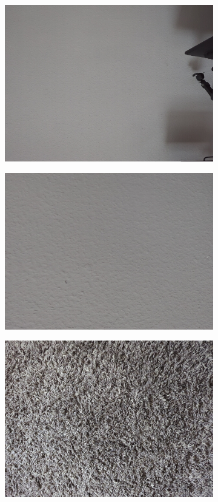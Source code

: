 \begin{figure}[h!t]
    \centering
    \begin{subfigure}[b]{0.25\textwidth}
        \centering
        \includegraphics[width=0.9\linewidth]{images/materials/wall-far-cam}
    \end{subfigure}%
    \begin{subfigure}[b]{0.25\textwidth}
        \centering
        \includegraphics[width=0.9\linewidth]{images/materials/wall-close-cam}
    \end{subfigure}%
    \begin{subfigure}[b]{0.25\textwidth}
        \centering
        \includegraphics[width=0.9\linewidth]{images/materials/carpet-cam}

\end{subfigure}
\end{figure}

